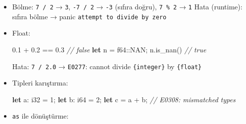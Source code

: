 \documentclass[12pt,a4paper]{article}
\newenvironment{Shaded}{}{}
\newcommand{\CommentTok}[1]{\textcolor[rgb]{0.38,0.63,0.69}{\textit{#1}}}
\newcommand{\DataTypeTok}[1]{\textcolor[rgb]{0.56,0.13,0.00}{#1}}
\newcommand{\DecValTok}[1]{\textcolor[rgb]{0.25,0.63,0.44}{#1}}
\newcommand{\FloatTok}[1]{\textcolor[rgb]{0.25,0.63,0.44}{#1}}
\newcommand{\FunctionTok}[1]{\textcolor[rgb]{0.02,0.16,0.49}{#1}}
\newcommand{\KeywordTok}[1]{\textcolor[rgb]{0.00,0.44,0.13}{\textbf{#1}}}
\newcommand{\NormalTok}[1]{#1}
\newcommand{\OperatorTok}[1]{\textcolor[rgb]{0.40,0.40,0.40}{#1}}
\begin{document}
\begin{itemize}
\begin{itemize}
\begin{Shaded}
\begin{Highlighting}[]
\DecValTok{255u}\DecValTok{8}\OperatorTok{.}\FunctionTok{checked\_add}\OperatorTok{(}\DecValTok{1}\OperatorTok{)}     \CommentTok{// None}
\DecValTok{255u}\DecValTok{8}\OperatorTok{.}\FunctionTok{wrapping\_add}\OperatorTok{(}\DecValTok{1}\OperatorTok{)}    \CommentTok{// 0}
\DecValTok{255u}\DecValTok{8}\OperatorTok{.}\FunctionTok{saturating\_add}\OperatorTok{(}\DecValTok{1}\OperatorTok{)}  \CommentTok{// 255}
\DecValTok{255u}\DecValTok{8}\OperatorTok{.}\FunctionTok{overflowing\_add}\OperatorTok{(}\DecValTok{1}\OperatorTok{)} \CommentTok{// (0, true)}
\end{Highlighting}
\end{Shaded}
  \end{itemize}
\item
  Bölme: \texttt{7\ /\ 2} → \texttt{3}, \texttt{-7\ /\ 2} → \texttt{-3} (sıfıra doğru), \texttt{7\ \%\ 2} → \texttt{1}
  Hata (runtime): sıfıra bölme → panic \texttt{attempt\ to\ divide\ by\ zero}
\item
  Float:

\begin{Shaded}
\begin{Highlighting}[]
\FloatTok{0.1} \OperatorTok{+} \FloatTok{0.2} \OperatorTok{==} \FloatTok{0.3}          \CommentTok{// false}
\KeywordTok{let}\NormalTok{ n }\OperatorTok{=} \DataTypeTok{f64}\OperatorTok{::}\NormalTok{NAN}\OperatorTok{;}
\NormalTok{n}\OperatorTok{.}\FunctionTok{is\_nan}\OperatorTok{()}                \CommentTok{// true}
\end{Highlighting}
\end{Shaded}


  Hata: \texttt{7\ /\ 2.0} → \texttt{E0277}: cannot divide \texttt{\{integer\}} by \texttt{\{float\}}
\item
  Tipleri karıştırma:

\begin{Shaded}
\begin{Highlighting}[]
\KeywordTok{let}\NormalTok{ a}\OperatorTok{:} \DataTypeTok{i32} \OperatorTok{=} \DecValTok{1}\OperatorTok{;}
\KeywordTok{let}\NormalTok{ b}\OperatorTok{:} \DataTypeTok{i64} \OperatorTok{=} \DecValTok{2}\OperatorTok{;}
\KeywordTok{let}\NormalTok{ c }\OperatorTok{=}\NormalTok{ a }\OperatorTok{+}\NormalTok{ b}\OperatorTok{;}   \CommentTok{// E0308: mismatched types}
\end{Highlighting}
\end{Shaded}
\item
  \texttt{as} ile dönüştürme:


\end{itemize}
\end{document}
